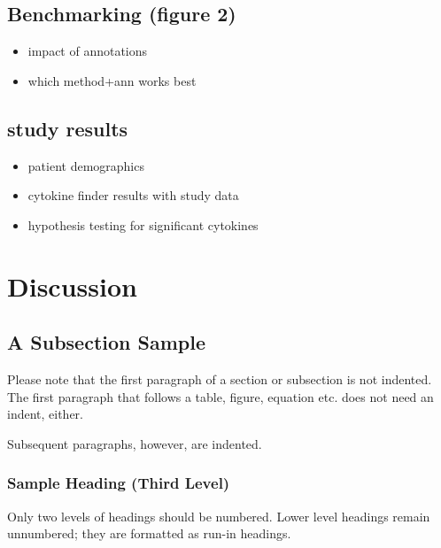 \documentclass[runningheads]{llncs}
\providecommand{\tightlist}{%
  \setlength{\itemsep}{0pt}\setlength{\parskip}{0pt}}
\begin{document}
\hypertarget{benchmarking-figure-2}{%
\subsection{Benchmarking (figure 2)}\label{benchmarking-figure-2}}

\begin{itemize}
\tightlist
\item
  impact of annotations
\item
  which method+ann works best
\end{itemize}

\hypertarget{study-results}{%
\subsection{study results}\label{study-results}}

\begin{itemize}
\tightlist
\item
  patient demographics
\item
  cytokine finder results with study data
\item
  hypothesis testing for significant cytokines
\end{itemize}

\hypertarget{discussion}{%
\section{Discussion}\label{discussion}}

\hypertarget{a-subsection-sample}{%
\subsection{A Subsection Sample}\label{a-subsection-sample}}

Please note that the first paragraph of a section or subsection is not
indented. The first paragraph that follows a table, figure, equation
etc. does not need an indent, either.

Subsequent paragraphs, however, are indented.

\hypertarget{sample-heading-third-level}{%
\subsubsection{Sample Heading (Third
Level)}\label{sample-heading-third-level}}

Only two levels of headings should be numbered. Lower level headings
remain unnumbered; they are formatted as run-in headings.
\end{document}
